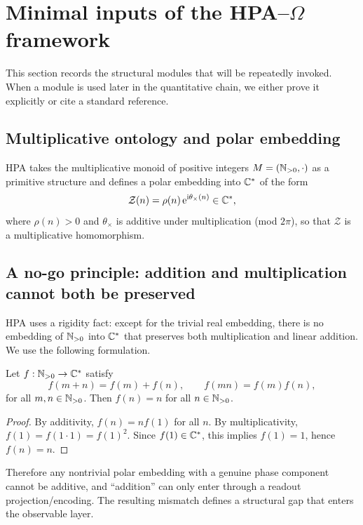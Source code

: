 \section{Minimal inputs of the HPA--\texorpdfstring{$\Omega$}{Omega} framework}
\label{sec:minimal_inputs}

This section records the structural modules that will be repeatedly invoked. When a module is used later in the quantitative chain, we either prove it explicitly or cite a standard reference.

\subsection{Multiplicative ontology and polar embedding}
HPA takes the multiplicative monoid of positive integers $M=(\mathbb{N}_{>0},\cdot)$ as a primitive structure and defines a polar embedding into $\mathbb{C}^*$ of the form
\begin{equation}
\mathcal{Z}(n)=\rho(n)\,\mathrm{e}^{\mathrm{i}\theta_\times(n)}\in \mathbb{C}^*,
\end{equation}
where $\rho(n)>0$ and $\theta_\times$ is additive under multiplication (mod $2\pi$), so that $\mathcal{Z}$ is a multiplicative homomorphism.

\subsection{A no-go principle: addition and multiplication cannot both be preserved}
HPA uses a rigidity fact: except for the trivial real embedding, there is no embedding of $\mathbb{N}_{>0}$ into $\mathbb{C}^*$ that preserves both multiplication and linear addition. We use the following formulation.

\begin{lemma}
\label{lem:no_go_add_mult}
Let $f:\mathbb{N}_{>0}\to\mathbb{C}^*$ satisfy
\begin{equation}
f(m+n)=f(m)+f(n),\qquad f(mn)=f(m)f(n),
\end{equation}
for all $m,n\in\mathbb{N}_{>0}$. Then $f(n)=n$ for all $n\in\mathbb{N}_{>0}$.
\end{lemma}
\begin{proof}
By additivity, $f(n)=nf(1)$ for all $n$. By multiplicativity, $f(1)=f(1\cdot 1)=f(1)^2$. Since $f(1)\in\mathbb{C}^*$, this implies $f(1)=1$, hence $f(n)=n$.
\end{proof}

Therefore any nontrivial polar embedding with a genuine phase component cannot be additive, and ``addition'' can only enter through a readout projection/encoding. The resulting mismatch defines a structural gap that enters the observable layer.

